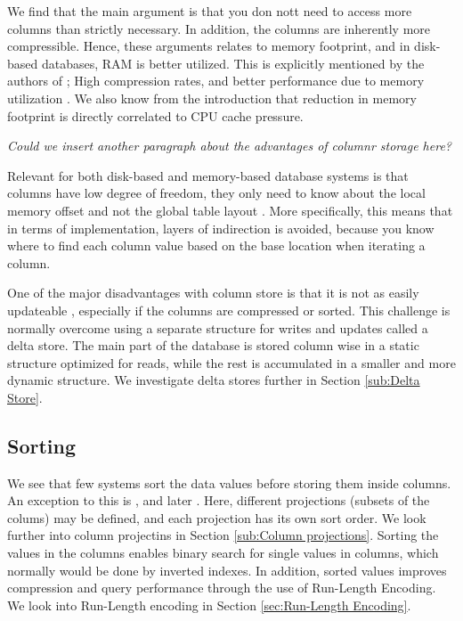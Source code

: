 We find that the main argument is that you don nott need to access more columns than strictly necessary. In addition, the columns are inherently more compressible. Hence, these arguments relates to memory footprint, and in disk-based databases, RAM is better utilized. This is explicitly mentioned by the authors of \mssql; High compression rates, and better performance due to memory utilization \cite{noauthor_undated-vq}. We also know from the introduction that reduction in memory footprint is directly correlated to CPU cache pressure. 

\textit{Could we insert another paragraph about the advantages of columnr storage here?}

Relevant for both disk-based and memory-based database systems is that columns have low degree of freedom, they only need to know about the local memory offset and not the global table layout \cite{Boncz2005-wj}. More specifically, this means that in terms of implementation, layers of indirection is avoided, because you know where to find each column value based on the base location when iterating a column. 

One of the major disadvantages with column store is that it is not as easily updateable \cite{Bjorklund2011-wh}, especially if the columns are compressed or sorted. This challenge is normally overcome using a separate structure for writes and updates called a delta store. The main part of the database is stored column wise in a static structure optimized for reads, while the rest is accumulated in a smaller and more dynamic structure. We investigate delta stores further in Section \ref{sub:Delta Store}.


\subsection{Sorting}
\label{sub:Sorting}
We see that few systems sort the data values before storing them inside columns. An exception to this is \cstore, and later \vertica \cite{Stonebraker2005-qz, Lamb2012-kg}. Here, different projections (subsets of the colums) may be defined, and each projection has its own sort order. We look further into column projectins in Section \ref{sub:Column projections}. Sorting the values in the columns enables binary search for single values in columns, which normally would be done by inverted indexes. In addition, sorted values improves compression and query performance through the use of Run-Length Encoding. We look into Run-Length encoding in Section \ref{sec:Run-Length Encoding}.

